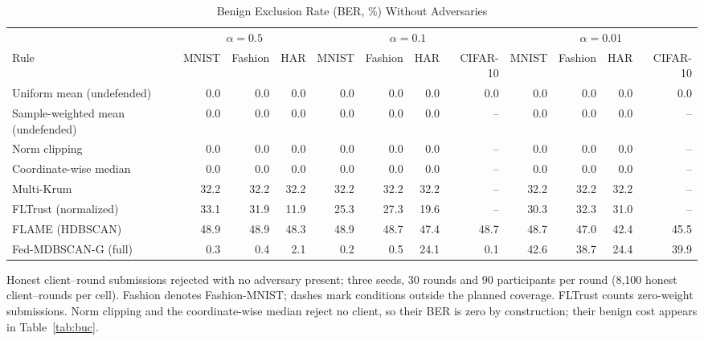 \begin{table}[!tp]
\centering\footnotesize
\setlength{\tabcolsep}{4pt}
\caption{Benign Exclusion Rate (BER, \%) Without Adversaries}\label{tab:ber}
\begin{adjustbox}{max width=\textwidth}
\begin{tabular}{lrrrrrrrrrrr}
\toprule
& \multicolumn{3}{c}{$\alpha=0.5$} & \multicolumn{4}{c}{$\alpha=0.1$} & \multicolumn{4}{c}{$\alpha=0.01$} \\
\cmidrule(lr){2-4}\cmidrule(lr){5-8}\cmidrule(lr){9-12}
Rule & MNIST & Fashion & HAR & MNIST & Fashion & HAR & CIFAR-10 & MNIST & Fashion & HAR & CIFAR-10 \\
\midrule
Uniform mean (undefended) & 0.0 & 0.0 & 0.0 & 0.0 & 0.0 & 0.0 & 0.0 & 0.0 & 0.0 & 0.0 & 0.0 \\
Sample-weighted mean (undefended) & 0.0 & 0.0 & 0.0 & 0.0 & 0.0 & 0.0 & -- & 0.0 & 0.0 & 0.0 & -- \\
Norm clipping & 0.0 & 0.0 & 0.0 & 0.0 & 0.0 & 0.0 & -- & 0.0 & 0.0 & 0.0 & -- \\
Coordinate-wise median & 0.0 & 0.0 & 0.0 & 0.0 & 0.0 & 0.0 & -- & 0.0 & 0.0 & 0.0 & -- \\
Multi-Krum & 32.2 & 32.2 & 32.2 & 32.2 & 32.2 & 32.2 & -- & 32.2 & 32.2 & 32.2 & -- \\
FLTrust (normalized) & 33.1 & 31.9 & 11.9 & 25.3 & 27.3 & 19.6 & -- & 30.3 & 32.3 & 31.0 & -- \\
FLAME (HDBSCAN) & 48.9 & 48.9 & 48.3 & 48.9 & 48.7 & 47.4 & 48.7 & 48.7 & 47.0 & 42.4 & 45.5 \\
Fed-MDBSCAN-G (full) & 0.3 & 0.4 & 2.1 & 0.2 & 0.5 & 24.1 & 0.1 & 42.6 & 38.7 & 24.4 & 39.9 \\
\bottomrule
\end{tabular}
\end{adjustbox}

\par\vspace{3pt}\parbox{\linewidth}{\footnotesize Honest client--round submissions rejected with no adversary present; three seeds, 30 rounds and 90 participants per round (8{,}100 honest client--rounds per cell). Fashion denotes Fashion-MNIST; dashes mark conditions outside the planned coverage. FLTrust counts zero-weight submissions. Norm clipping and the coordinate-wise median reject no client, so their BER is zero by construction; their benign cost appears in Table~\ref{tab:buc}.}
\end{table}
